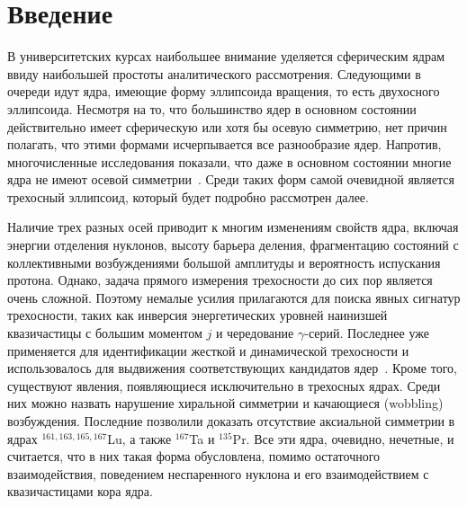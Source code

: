\documentclass[a4paper, 10pt, twocolumn]{article}
\begin{document}

\section{Введение}%

В университетских курсах наибольшее внимание уделяется сферическим ядрам 
ввиду наибольшей простоты аналитического рассмотрения. Следующими 
в очереди идут ядра, имеющие форму эллипсоида вращения, то есть 
двухосного эллипсоида. Несмотря на то, что большинство ядер в основном 
состоянии действительно имеет сферическую или хотя бы осевую симметрию, 
нет причин полагать, что этими формами исчерпывается все разнообразие 
ядер. Напротив, многочисленные исследования показали, что даже 
в основном состоянии многие ядра не имеют осевой 
симметрии~\cite{gs1,gs2,gs3}. Среди таких форм самой очевидной является 
трехосный эллипсоид, который будет подробно рассмотрен далее.

Наличие трех разных осей приводит к многим изменениям свойств ядра, 
включая энергии отделения нуклонов, высоту барьера деления, фрагментацию 
состояний с коллективными возбуждениями большой амплитуды и вероятность 
испускания протона. Однако, задача прямого измерения трехосности до сих 
пор является очень сложной. Поэтому немалые усилия прилагаются для 
поиска явных сигнатур трехосности, таких как инверсия энергетических 
уровней наинизшей квазичастицы с большим моментом $j$ и чередование 
$\gamma$-серий. Последнее уже применяется для идентификации жесткой 
и динамической трехосности и использовалось для выдвижения 
соответствующих кандидатов ядер~\cite{gamma-rigid}.
Кроме того, существуют явления, появляющиеся исключительно в трехосных 
ядрах. Среди них можно назвать нарушение хиральной симметрии 
и качающиеся (wobbling) возбуждения. Последние позволили доказать 
отсутствие аксиальной симметрии в ядрах $^{161,163,165,167}$Lu, а также 
$^{167}$Ta и $^{135}$Pr. Все эти ядра, очевидно, нечетные, и считается, 
что в них такая форма обусловлена, помимо остаточного взаимодействия, 
поведением неспаренного нуклона и его взаимодействием с квазичастицами 
кора ядра.
\end{document}
